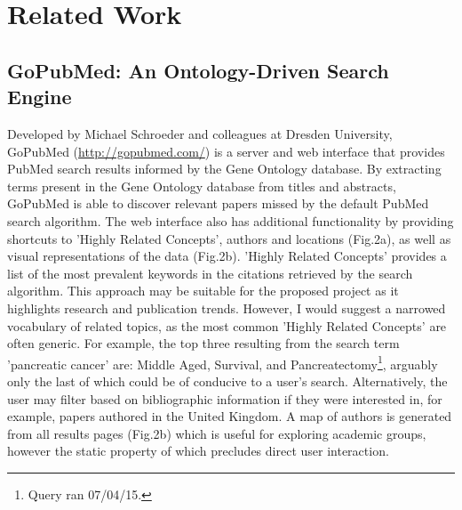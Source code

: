 \documentclass[PROP_AGutteridge_CS.tex]{subfiles}
\begin{document}
\chapter{Related Work}
\section{GoPubMed: An Ontology-Driven Search Engine}
Developed by Michael Schroeder and colleagues at Dresden University, GoPubMed (\url{http://gopubmed.com/}) is a server and web interface that provides PubMed search results informed by the Gene Ontology database\cite{doms}. By extracting terms present in the Gene Ontology database from titles and abstracts, GoPubMed is able to discover relevant papers missed by the default PubMed search algorithm. The web interface also has additional functionality by providing shortcuts to 'Highly Related Concepts', authors and locations (Fig.2a), as well as visual representations of the data (Fig.2b). 'Highly Related Concepts' provides a list of the most prevalent keywords in the citations retrieved by the search algorithm. This approach may be suitable for the proposed project as it highlights research and publication trends. However, I would suggest a narrowed vocabulary of related topics, as the most common 'Highly Related Concepts' are often generic. For example, the top three resulting from the search term 'pancreatic cancer' are: Middle Aged, Survival, and Pancreatectomy\footnote{Query ran 07/04/15.}, arguably only the last of which could be of conducive to a user's search. Alternatively, the user may filter based on bibliographic information if they were interested in, for example, papers authored in the United Kingdom. A map of authors is generated from all results pages (Fig.2b) which is useful for exploring academic groups, however the static property of which precludes direct user interaction.\newpage
\end{document}
